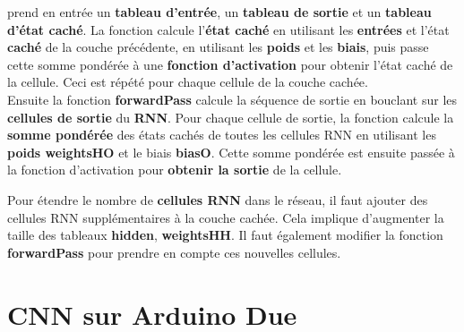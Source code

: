 \documentclass[a4paper, 12pt, openany]{book}
\begin{document}
\begin{enumerate}
{    prend en entrée un \textbf{tableau d'entrée}, un \textbf{tableau de sortie} et un \textbf{tableau d'état caché}. La fonction calcule l'\textbf{état caché} en utilisant les \textbf{entrées} et l'état \textbf{caché}
    de la couche précédente, en utilisant les \textbf{poids} et les \textbf{biais}, puis passe cette somme pondérée à une \textbf{fonction d'activation} pour obtenir l'état caché de la cellule. Ceci est répété pour chaque 
    cellule de la couche cachée. \\
    Ensuite la fonction \textbf{forwardPass} calcule la séquence de sortie en bouclant sur les \textbf{cellules de sortie} du \textbf{RNN}. Pour chaque cellule de sortie, la fonction calcule la \textbf{somme pondérée} des états
    cachés de toutes les cellules RNN en utilisant les \textbf{poids weightsHO} et le biais \textbf{biasO}. Cette somme pondérée est ensuite passée à la fonction d'activation pour \textbf{obtenir la sortie} de la cellule.
  
    Pour étendre le nombre de \textbf{cellules RNN} dans le réseau, il faut ajouter des cellules RNN supplémentaires à la couche cachée. Cela implique d'augmenter la taille des tableaux \textbf{hidden}, \textbf{weightsHH}.
    Il faut également modifier la fonction \textbf{forwardPass} pour prendre en compte ces nouvelles cellules.
  }
\end{enumerate}

\chapter{CNN sur Arduino Due}
\end{document}
